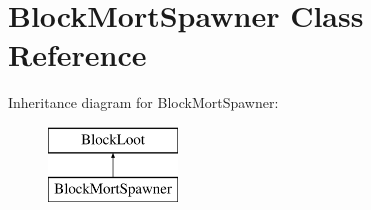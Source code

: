 \hypertarget{class_block_mort_spawner}{}\section{Block\+Mort\+Spawner Class Reference}
\label{class_block_mort_spawner}
Inheritance diagram for Block\+Mort\+Spawner\+:\begin{figure}[H]
\begin{center}
\leavevmode
\includegraphics[height=2.000000cm]{class_block_mort_spawner}
\end{center}
\end{figure}
